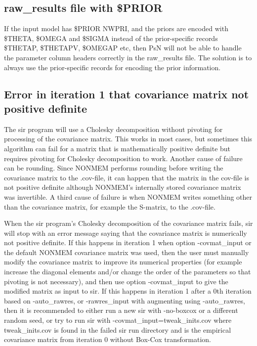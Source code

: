 \subsection*{raw\_results file with \$PRIOR}
If the input model has \$PRIOR NWPRI, and the priors are encoded with \$THETA, \$OMEGA and \$SIGMA instead of the
prior-specific records \$THETAP, \$THETAPV, \$OMEGAP etc, then PsN will not be able to handle the parameter column
headers correctly in the raw\_results file. The solution is to always use the prior-specific records for
encoding the prior information.
\subsection*{Error in iteration 1 that covariance matrix not positive definite}
The sir program will use a Cholesky decomposition without pivoting for processing of the covariance matrix. 
This works in most cases, but sometimes this algorithm can fail for a matrix that is mathematically positive definite
but requires pivoting for Cholesky decomposition to work. Another cause of failure can be rounding. 
Since NONMEM performs rounding before writing 
the covariance matrix to the .cov-file, it can happen that the matrix in the cov-file is not positive definite
although NONMEM's internally stored covariance matrix was invertible. A third cause of failure
is when NONMEM writes something other than the covariance matrix, for example the S-matrix, to the .cov-file.

When the sir program's Cholesky decomposition of the covariance matrix fails, 
sir will stop with an error message saying that the covariance matrix is numerically not positive definite. 
If this happens in iteration 1 when option -covmat\_input or the default NONMEM covariance matrix was used, 
then the user must manually modify the covariance matrix to improve its numerical properties (for example increase the diagonal elements
and/or change the order of the parameters so that pivoting is not necessary),
and then use option -covmat\_input to give the modified matrix as input to sir. 
If this happens in iteration 1 after a 0th iteration based on -auto\_rawres, or -rawres\_input with augmenting using -auto\_rawres, 
then it is recommended to either run a new sir with -no-boxcox or a different random seed, or 
try to run sir with -covmat\_input=tweak\_inits.cov where tweak\_inits.cov is found in the failed sir run directory and
is the empirical covariance matrix from iteration 0 without Box-Cox transformation.

